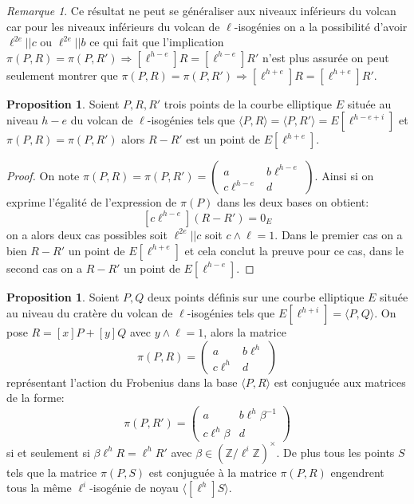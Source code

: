 \documentclass[10pt,a4paper]{book}
\theoremstyle{plain}
\theoremstyle{definition}
\theoremstyle{definition}
\theoremstyle{definition}
\newtheorem{prop}[thm]{Proposition}
\theoremstyle{definition}
\theoremstyle{remark}
\newtheorem{rem}[thm]{Remarque}
\theoremstyle{remark}
\theoremstyle{definition}
\begin{document}
\begin{rem}
Ce résultat ne peut se généraliser aux niveaux inférieurs du volcan car pour 
les niveaux inférieurs du volcan de $\ell$-isogénies on a la possibilité 
d'avoir $\ell^{2e}||c$ ou $\ell^{2e}||b$ ce qui fait que l'implication 
$\pi(P,R)=\pi(P,R') \Rightarrow [\ell^{h-e}]R=[\ell^{h-e}]R'$ n'est plus 
assurée on peut seulement montrer que $\pi(P,R)=\pi(P,R') \Rightarrow 
[\ell^{h+e}]R=[\ell^{h+e}]R'$.
\end{rem}
\begin{prop}
\label{pro:atk:inv:mat}
Soient $P,R,R'$ trois points de la courbe elliptique $E$ située au niveau $h-e$
du volcan de $\ell$-isogénies tels que $\langle P,R \rangle = \langle P,R' 
\rangle = E[\ell^{h-e+i}]$ et $\pi(P,R)=\pi(P,R')$ alors $R-R'$ est un point de 
$E[\ell^{h+e}]$.
\end{prop}

\begin{proof}
On note $\pi(P,R)=\pi(P,R')= \left(  \begin{smallmatrix}a & b \ell^{h-e} \\ 
c\ell^{h-e}  & d \end{smallmatrix} \right)$. Ainsi si on exprime l'égalité de 
l'expression de $\pi(P)$ dans les deux bases on obtient:
\[
[c\ell^{h-e}](R-R')=0_{E}
\]
on a alors deux cas possibles soit $ \ell^{2e} || c $ soit $c \wedge \ell=1$.
Dans le premier cas on a bien $R-R'$ un point de  $E[\ell^{h+e}]$ et cela 
conclut la preuve pour ce cas, dans le second cas on a $R-R'$ un point de 
$E[\ell^{h-e}]$.
\end{proof}


\begin{prop}
\label{pro:cla:fro:mat}
Soient $P,Q$ deux points définis sur une courbe elliptique $E$ située au niveau
du cratère du volcan de $\ell$-isogénies tels que 
$E[\ell^{h+i}]=\langle P,Q \rangle$. On pose $R=[x]P+[y]Q$ avec $y\wedge 
\ell=1$, alors la matrice 
\[
\pi(P,R)=\left ( \begin{matrix}a & b\ell^{h} \\ c\ell^{h} & d
\end{matrix}\right ) 
\] représentant l'action du Frobenius dans la base $\langle P,R \rangle$ est
conjuguée aux matrices de la forme:
\[
\pi(P,R')=\left ( \begin{matrix}a & b\ell^{h}\beta^{-1} \\ c\ell^{h}\beta & d
\end{matrix}\right ) 
\]
si et seulement si $\beta \ell^{h}R= \ell^{h}R'$ avec $\beta \in \left( \mathbb{Z}/\ell^{i} \mathbb{Z} 
\right)^{\times}$. De plus tous les points $S$ tels que la matrice $\pi(P,S)$ 
est conjuguée à la matrice $\pi(P,R)$ engendrent tous la même $\ell^i$-isogénie
de noyau $\langle [\ell^{h}]S \rangle$.
\end{prop}
\end{document}
